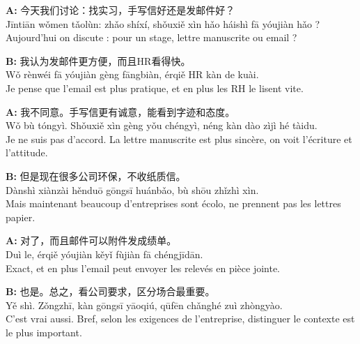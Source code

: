 \documentclass[11pt]{article}
\begin{document}
\begin{corrige}
\textbf{A:} 今天我们讨论：找实习，手写信好还是发邮件好？\\
Jīntiān wǒmen tǎolùn: zhǎo shíxí, shǒuxiě xìn hǎo háishì fā yóujiàn hǎo ?\\
Aujourd'hui on discute : pour un stage, lettre manuscrite ou email ?

\textbf{B:} 我认为发邮件更方便，而且HR看得快。\\
Wǒ rènwéi fā yóujiàn gèng fāngbiàn, érqiě HR kàn de kuài.\\
Je pense que l'email est plus pratique, et en plus les RH le lisent vite.

\textbf{A:} 我不同意。手写信更有诚意，能看到字迹和态度。\\
Wǒ bù tóngyì. Shǒuxiě xìn gèng yǒu chéngyì, néng kàn dào zìjì hé tàidu.\\
Je ne suis pas d'accord. La lettre manuscrite est plus sincère, on voit l'écriture et l'attitude.

\textbf{B:} 但是现在很多公司环保，不收纸质信。\\
Dànshì xiànzài hěnduō gōngsī huánbǎo, bù shōu zhǐzhì xìn.\\
Mais maintenant beaucoup d'entreprises sont écolo, ne prennent pas les lettres papier.

\textbf{A:} 对了，而且邮件可以附件发成绩单。\\
Duì le, érqiě yóujiàn kěyǐ fùjiàn fā chéngjīdān.\\
Exact, et en plus l'email peut envoyer les relevés en pièce jointe.

\textbf{B:} 也是。总之，看公司要求，区分场合最重要。\\
Yě shì. Zǒngzhī, kàn gōngsī yāoqiú, qūfēn chǎnghé zuì zhòngyào.\\
C'est vrai aussi. Bref, selon les exigences de l'entreprise, distinguer le contexte est le plus important.
\end{corrige}
\end{document}

